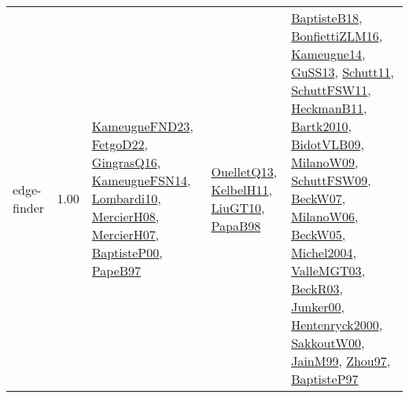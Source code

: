 {\begin{longtable}{p{3cm}r>{\raggedright\arraybackslash}p{6cm}>{\raggedright\arraybackslash}p{6cm}>{\raggedright\arraybackslash}p{8cm}}
\index{edge-finder}\index{Algorithms!edge-finder}edge-finder &  1.00 & \hyperref[detail:KameugneFND23]{KameugneFND23}, \hyperref[detail:FetgoD22]{FetgoD22}, \hyperref[detail:GingrasQ16]{GingrasQ16}, \hyperref[detail:KameugneFSN14]{KameugneFSN14}, \hyperref[detail:Lombardi10]{Lombardi10}, \hyperref[detail:MercierH08]{MercierH08}, \hyperref[detail:MercierH07]{MercierH07}, \hyperref[detail:BaptisteP00]{BaptisteP00}, \hyperref[detail:PapeB97]{PapeB97} & \hyperref[detail:OuelletQ13]{OuelletQ13}, \hyperref[detail:KelbelH11]{KelbelH11}, \hyperref[detail:LiuGT10]{LiuGT10}, \hyperref[detail:PapaB98]{PapaB98} & \hyperref[detail:BaptisteB18]{BaptisteB18}, \hyperref[detail:BonfiettiZLM16]{BonfiettiZLM16}, \hyperref[detail:Kameugne14]{Kameugne14}, \hyperref[detail:GuSS13]{GuSS13}, \hyperref[detail:Schutt11]{Schutt11}, \hyperref[detail:SchuttFSW11]{SchuttFSW11}, \hyperref[detail:HeckmanB11]{HeckmanB11}, \hyperref[detail:Bartk2010]{Bartk2010}, \hyperref[detail:BidotVLB09]{BidotVLB09}, \hyperref[detail:MilanoW09]{MilanoW09}, \hyperref[detail:SchuttFSW09]{SchuttFSW09}, \hyperref[detail:BeckW07]{BeckW07}, \hyperref[detail:MilanoW06]{MilanoW06}, \hyperref[detail:BeckW05]{BeckW05}, \hyperref[detail:Michel2004]{Michel2004}, \hyperref[detail:ValleMGT03]{ValleMGT03}, \hyperref[detail:BeckR03]{BeckR03}, \hyperref[detail:Junker00]{Junker00}, \hyperref[detail:Hentenryck2000]{Hentenryck2000}, \hyperref[detail:SakkoutW00]{SakkoutW00}, \hyperref[detail:JainM99]{JainM99}, \hyperref[detail:Zhou97]{Zhou97}, \hyperref[detail:BaptisteP97]{BaptisteP97}\\

\end{longtable}}
